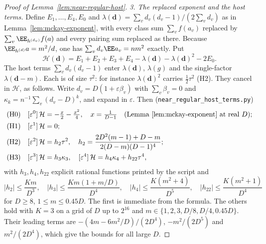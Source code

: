 \begin{proof}[Proof of Lemma~\ref{lem:near-regular-host}]
\emph{3. The replaced exponent and the host terms.} Define \(E_1,\dots,E_4,E_0\)
and \(\lambda(\mathbf d)=\sum_vd_v(d_v-1)/(2\sum_vd_v)\) as in
Lemma~\ref{lem:mckay-exponent}, with every class sum
\(\sum_vf(a_v)\) replaced by \(\sum_v\EE_{h^{(d_v)}}f(a)\) and every pairing sum
replaced as there. Because
\(\EE_{h^{(d)}}a=m^2/d\), one has \(\sum_vd_v\EE a_v=nm^2\) exactly. Put
\[
\mathcal H(\mathbf d)=E_1+E_2+E_3+E_4-\lambda(\mathbf d)-\lambda(\mathbf d)^2-2E_0 .
\]
The host terms \(\sum_vd_v(d_v-1)\) enter \(\lambda(\mathbf d)\), \(\lambda(g)\) and
the single-factor \(\lambda(\mathbf d-m)\). Each is of size \(\tau^2\): for instance
\(\lambda(\mathbf d)^2\) carries \(\tfrac12\tau^2\) (H2). They cancel in
\(\mathcal H\), as follows. Write \(d_v=D(1+\varepsilon\beta_v)\) with
\(\sum_v\beta_v=0\) and \(\kappa_k=n^{-1}\sum_v(d_v-D)^k\), and expand in
\(\varepsilon\). Then (\texttt{near\_regular\_host\_terms.py})
\begin{align*}
\text{(H0)}\quad&[\varepsilon^0]\,\mathcal H=-\tfrac x2-\tfrac{x^2}4,\quad x=\tfrac1{D-1}
\quad\text{(Lemma~\ref{lem:mckay-exponent} at real \(D\))};\\
\text{(H1)}\quad&[\varepsilon^1]\,\mathcal H=0;\\
\text{(H2)}\quad&[\varepsilon^2]\,\mathcal H=h_2\tau^2,\quad
h_2=\frac{2D^2(m-1)+D-m}{2(D-m)(D-1)^4};\\
\text{(H3)}\quad&[\varepsilon^3]\,\mathcal H=h_3\kappa_3,\quad
[\varepsilon^4]\,\mathcal H=h_4\kappa_4+h_{22}\tau^4,
\end{align*}
with \(h_3,h_4,h_{22}\) explicit rational functions printed by the script and
\[
\lvert h_2\rvert\le\frac{Km}{D^3},\quad
\lvert h_3\rvert\le\frac{Km(1+m/D)}{D^4},\quad
\lvert h_4\rvert\le\frac{K(m^2+4)}{D^5},\quad
\lvert h_{22}\rvert\le\frac{K(m^2+1)}{D^4}
\]
for \(D\ge8\), \(1\le m\le0.45D\). The first is immediate from the formula.
The others hold with \(K=3\) on a grid of \(D\) up to \(2^{16}\) and \(m\in\{1,2,3,D/8,D/4,0.45D\}\).
Their leading terms are \(-(4m-6m^2/D)/(2D^4)\), \(-m^2/(2D^5)\) and
\(m^2/(2D^4)\), which give the bounds for all large \(D\).


\end{proof}
